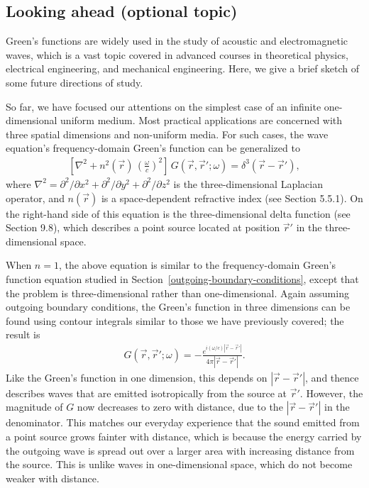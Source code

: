\documentclass[10pt,a4paper]{article}
\begin{document}
\subsection{Looking ahead (optional topic)}\label{looking-ahead}

Green's functions are widely used in the study of acoustic and
electromagnetic waves, which is a vast topic covered in advanced
courses in theoretical physics, electrical engineering, and mechanical
engineering. Here, we give a brief sketch of some future directions of
study.

So far, we have focused our attentions on the simplest case of an
infinite one-dimensional uniform medium. Most practical applications
are concerned with three spatial dimensions and non-uniform media. For
such cases, the wave equation's frequency-domain Green's function can
be generalized to
\begin{align}
  \left[\nabla^2 + n^2(\vec{r}) \, \left(\frac{\omega}{c}\right)^2\right]\, G(\vec{r},\vec{r}';\omega) = \delta^3(\vec{r}-\vec{r}'),
\end{align}
where $\nabla^2 = \partial^2/\partial x^2 + \partial^2/\partial y^2 +
\partial^2/\partial z^2$ is the three-dimensional Laplacian operator,
and $n(\vec{r})$ is a space-dependent refractive index (see Section
5.5.1). On the right-hand side of this equation is the
three-dimensional delta function (see Section 9.8), which describes a
point source located at position $\vec{r}'$ in the three-dimensional
space.

When $n = 1$, the above equation is similar to the frequency-domain
Green's function equation studied in
Section~\ref{outgoing-boundary-conditions}, except that the problem is
three-dimensional rather than one-dimensional. Again assuming outgoing
boundary conditions, the Green's function in three dimensions can be
found using contour integrals similar to those we have previously
covered; the result is
\begin{align}
  G(\vec{r},\vec{r}';\omega) = -\frac{e^{i(\omega/c)|\vec{r}-\vec{r}'|}}{4\pi|\vec{r}-\vec{r}'|}.
\end{align}
Like the Green's function in one dimension, this depends on
$|\vec{r}-\vec{r}'|$, and thence describes waves that are emitted
isotropically from the source at $\vec{r}'$. However, the magnitude of
$G$ now decreases to zero with distance, due to the
$|\vec{r}-\vec{r}'|$ in the denominator. This matches our everyday
experience that the sound emitted from a point source grows fainter
with distance, which is because the energy carried by the outgoing
wave is spread out over a larger area with increasing distance from
the source. This is unlike waves in one-dimensional space, which do
not become weaker with distance.
\end{document}
